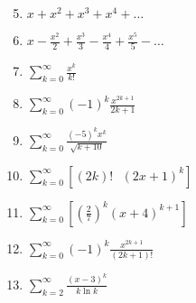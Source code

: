 \documentclass[12pt]{article}
\newif\ifans
\begin{document}
\begin{enumerate}
\setcounter{enumi}{4}

\item $x+x^2+x^3+x^4+\ldots$

\ifans{\fbox{$(-1, 1); R=1$.  Note that this is the power series from \underline{Infinite Series} \#24.}} \fi

\item $x-\frac{x^2}{2}+\frac{x^3}{3}-\frac{x^4}{4}+\frac{x^5}{5}-\ldots$

\ifans{\fbox{$(-1, 1]; R=1$.  This is the Maclaurin series for $f(x)=\ln(1+x)$.  See problem \#1.}} \fi

\item $\sum_{k=0}^{\infty}{\frac{x^k}{k!}}$

\ifans{\fbox{$(-\infty, +\infty); R=+\infty$.  This is the Maclaurin series for $f(x)=e^x.$}} \fi

\item $\sum_{k=0}^{\infty}{(-1)^k\frac{x^{2k+1}}{2k+1}}$

\ifans{\fbox{$[-1, 1]; R=1$.}} \fi

\item $\sum_{k=0}^{\infty}{\frac{(-5)^k x^k}{\sqrt{k+10}}}$

\ifans{\fbox{$\left(-\frac{1}{5}, \frac{1}{5}\right]; R=\frac{1}{5}$; Detailed Solution: \textcolor{blue}{\href{http://www.math.drexel.edu/classes/Calculus/resources/Math123HW/Solutions/123_12_Power_Series_09.pdf}{Here}}}} \fi

\item $\sum_{k=0}^{\infty}{\left[(2k)! \text{ } (2x+1)^k\right]}$

\ifans{\fbox{$\left[-\frac{1}{2}, -\frac{1}{2}\right]$, or just $\left\{-\frac{1}{2}\right\}; R=0$.  In other words, the series converges only when $x=-\frac{1}{2}$.   }} \fi

\item $\sum_{k=0}^{\infty}{\left[ \left( \frac{2}{7} \right)^k (x+4)^{k+1} \right] }$

\ifans{\fbox{$\left(-\frac{15}{2}, -\frac{1}{2}\right); R=\frac{7}{2}$; Detailed Solution: \textcolor{blue}{\href{http://www.math.drexel.edu/classes/Calculus/resources/Math123HW/Solutions/123_12_Power_Series_11.pdf}{Here}}}} \fi


\item $\sum_{k=0}^{\infty}{(-1)^k\frac{x^{2k+1}}{(2k+1)!}}$

\ifans{\fbox{$(-\infty, +\infty); R=+\infty$.  This is the Maclaurin series for $f(x)=\sin{x}$.}} \fi

\item $\sum_{k=2}^{\infty}{\frac{(x-3)^k}{k\ln{k}}}$

\ifans{\fbox{$[2, 4); R = 1$}} \fi

\end{enumerate}
\end{document}
